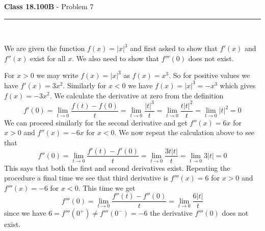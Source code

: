 \documentclass[11pt,reqno]{article}
\begin{document}
\vspace{15pt}
\begin{flushleft} 
\textbf{Class 18.100B} - Problem 7\\
\rule{500pt}{1pt}\\
\end{flushleft} 

We are given the function $f(x) = |x|^3$ and first asked to show that $f'(x)$ and $f''(x)$ exist for all $x$. We also need to show that $f'''(0)$ does not exist.

For $x > 0$ we may write $f(x) = |x|^3$ as $f(x) = x^3$. So for positive values we have $f'(x) = 3 x^2$. Similarly for  $x < 0$ we have $f(x) = |x|^3 = - x^3$ which gives $f(x) = -3 x^2$. We calculate the derivative at zero from the definition
\[ f'(0) = \lim_{t \to 0}\frac{f(t) - f(0)}{t} = \lim_{t \to 0} \frac{|t|^3}{t} = \lim_{t \to 0} \frac{t|t|^2}{t} = \lim_{t \to 0} |t|^2 = 0 \]
We can proceed similarly for the second derivative and get $f''(x) = 6 x$ for $x > 0$ and $f''(x) = - 6 x$ for $x < 0$. We now repeat the calculation above to see that 
\[ f''(0) = \lim_{t \to 0}\frac{f'(t) - f'(0)}{t} = \lim_{t \to 0} \frac{3 t |t|}{t} = \lim_{t \to 0} 3|t|  = 0 \]
\indent This says that both the first and second derivatives exist. Repeating the procedure a final time we see that third derivative is $f'''(x) = 6$ for $x > 0$ and $f'''(x) = -6$ for $x < 0$. This time we get
\[ f'''(0) = \lim_{t \to 0}\frac{f''(t) - f''(0)}{t} = \lim_{t \to 0} \frac{6|t|}{t} \]
since we have $6 = f'''(0^+) \neq f'''(0^-) = -6$ the derivative $f'''(0)$ does not exist.
\end{document}
